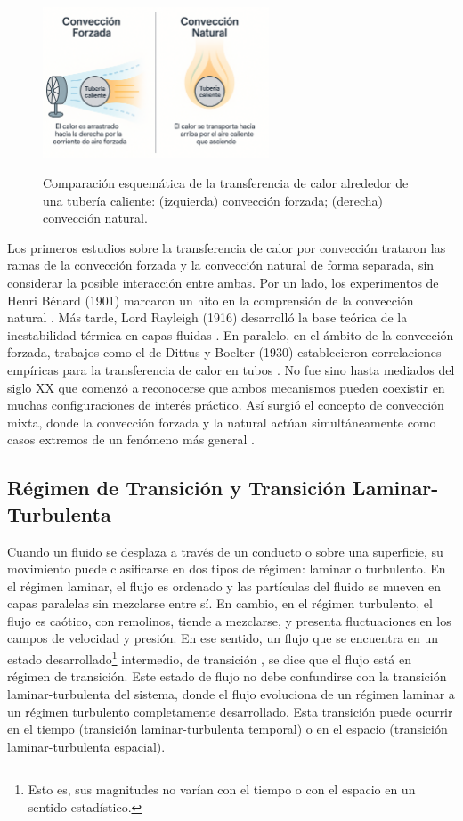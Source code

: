\begin{figure}[H]
 \centering
    \includegraphics[width=0.6\textwidth]{figures/cap1/natural_forzada.png}
    \label{fig:natural_forzada} 
 \caption{Comparación esquemática de la transferencia de calor alrededor de una tubería caliente: (izquierda) convección forzada; (derecha) convección natural.} 
 \label{fig:natural_forzada}
\end{figure}


Los primeros estudios sobre la transferencia de calor por convección trataron las ramas de la convección forzada y la convección natural de forma separada, sin considerar la posible interacción entre ambas. Por un lado, los experimentos de Henri Bénard (1901) marcaron un hito en la comprensión de la convección natural \cite{benard1901}. Más tarde, Lord Rayleigh (1916) desarrolló la base teórica de la inestabilidad térmica en capas fluidas \cite{rayleigh1916}. En paralelo, en el ámbito de la convección forzada, trabajos como el de Dittus y Boelter (1930) establecieron correlaciones empíricas para la transferencia de calor en tubos \cite{dittus1930}. No fue sino hasta mediados del siglo XX que comenzó a reconocerse que ambos mecanismos pueden coexistir en muchas configuraciones de interés práctico. Así surgió el concepto de convección mixta, donde la convección forzada y la natural actúan simultáneamente como casos extremos de un fenómeno más general \cite{tao1960,metais1964}. 

\subsection*{Régimen de Transición y Transición Laminar-Turbulenta}

Cuando un fluido se desplaza a través de un conducto o sobre una superficie, su movimiento puede clasificarse en dos tipos de régimen: laminar o turbulento. En el régimen laminar, el flujo es ordenado y las partículas del fluido se mueven en capas paralelas sin mezclarse entre sí. En cambio, en el régimen turbulento, el flujo es caótico, con remolinos, tiende a mezclarse, y presenta fluctuaciones en los campos de velocidad y presión. En ese sentido, un flujo que se encuentra en un estado desarrollado\footnote{Esto es, sus magnitudes no varían con el tiempo o con el espacio en un sentido estadístico.} intermedio, de transición , se dice que el flujo está en régimen de transición. Este estado de flujo no debe confundirse con la transición laminar-turbulenta del sistema, donde el flujo evoluciona de un régimen laminar a un régimen turbulento completamente desarrollado. Esta transición puede ocurrir en el tiempo (transición laminar-turbulenta temporal) o en el espacio (transición laminar-turbulenta espacial).

